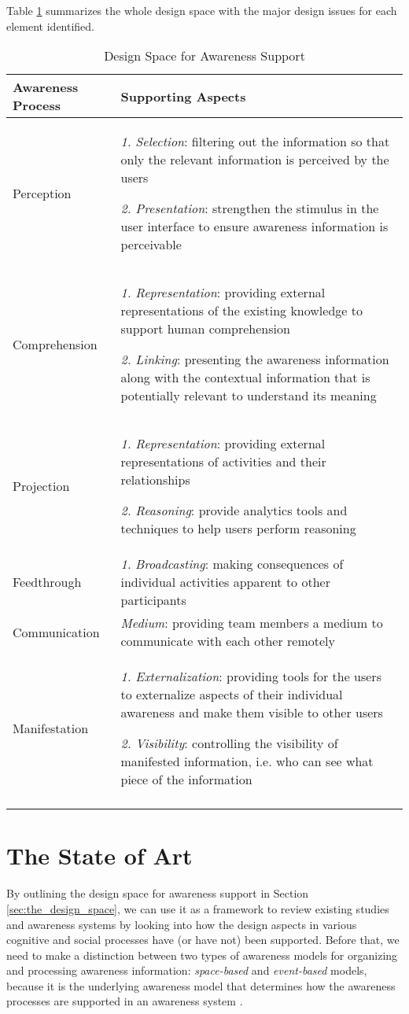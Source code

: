Table \ref{tab:design_space} summarizes the whole design space with the major design issues for each element identified.

{\footnotesize
	\begin{longtable}{>{\raggedright}m{1.2in}>{\raggedright}p{4.3in}}
\toprule 
\textbf{Awareness Process} & \textbf{Supporting Aspects}\tabularnewline
\midrule 
Perception & \emph{1. Selection}: filtering out the information so that only the
relevant information is perceived by the users

\emph{2. Presentation}: strengthen the stimulus in the user interface
to ensure awareness information is perceivable\tabularnewline
\midrule 
Comprehension & \emph{1. Representation}: providing external representations of the
existing knowledge to support human comprehension

\emph{2. Linking}: presenting the awareness information
along with the contextual information that is potentially relevant
to understand its meaning\tabularnewline
\midrule 
Projection & \emph{1. Representation}: providing external representations of activities
and their relationships 

\emph{2. Reasoning}: provide analytics tools and techniques to help
users perform reasoning\tabularnewline
\midrule 
Feedthrough & \emph{1. }\textit{Broadcasting}: making consequences of individual
activities apparent to other participants\tabularnewline
\midrule 
Communication & \textit{Medium}: providing team members a medium to communicate
with each other remotely\tabularnewline
\midrule 
Manifestation & \textit{1. Externalization}: providing tools for the users to externalize aspects of their individual awareness and make them visible to other users

\textit{2. Visibility}: controlling the visibility of manifested information,
i.e. who can see what piece of the information\tabularnewline
\bottomrule

\caption{Design Space for Awareness Support}
\label{tab:design_space}

\end{longtable}	
}


\section{The State of Art} %
\label{sec:the_state_of_art}
By outlining the design space for awareness support in Section \ref{sec:the_design_space}, we can use it as a framework to review existing studies and awareness systems by looking into how the design aspects in various cognitive and social processes have (or have not) been supported. Before that, we need to make a distinction between two types of awareness models for organizing and processing awareness information: \emph{space-based} and \emph{event-based} models, because it is the underlying awareness model that determines how the awareness processes are supported in an awareness system \cite{Gross2004}.

